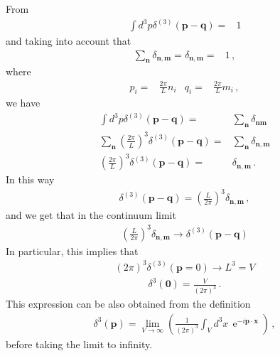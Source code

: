 \begin{frame}
From
\begin{align}
  \int d^3p \delta^{(3)}(\mathbf{p}-\mathbf{q})=&1
\end{align}
and taking into account that
\begin{align}
  \sum_{\mathbf{n}} \delta_{\mathbf{n}, \mathbf{m}}=\delta_{\mathbf{n}, \mathbf{m}}=&1\,,
\end{align}
where
\begin{align}
  p_i=&\frac{2\pi}{L}n_i & q_i=&\frac{2\pi}{L}m_i\,,
\end{align}
we have
\begin{align}
  \int d^3p \delta^{(3)}(\mathbf{p}-\mathbf{q})=&\sum_{\mathbf{n}} \delta_{\mathbf{n}\mathbf{m}}\nonumber\\
 \sum_{\mathbf{n}} \left(\frac{2\pi}{L}\right)^3\delta^{(3)}(\mathbf{p}-\mathbf{q})=&\sum_{\mathbf{n}} \delta_{\mathbf{n}, \mathbf{m}}\nonumber\\
  \left(\frac{2\pi}{L}\right)^3\delta^{(3)}(\mathbf{p}-\mathbf{q})=& \delta_{\mathbf{n}, \mathbf{m}}\,.
\end{align}
In this way
\begin{align}
  \delta^{(3)}(\mathbf{p}-\mathbf{q})=\left(\frac{L}{2\pi}\right)^3\delta_{\mathbf{n},\mathbf{m}}\,,
\end{align}
and we get that in the continuum limit
\begin{align}
  \label{eq:24}
\left(\frac{L}{2\pi}\right)^3\delta_{\mathbf{n},\mathbf{m}}\to  \delta^{(3)}(\mathbf{p}-\mathbf{q})
\end{align}
In particular, this implies that
\begin{align}
  \label{eq:25}
  (2\pi)^3\delta^{(3)}(\mathbf{p}=0)\to L^3=V
\end{align}
\begin{align}
\label{eq:26f}
  \delta^3(\mathbf{0})=\frac{V}{(2\pi)^3}\,.
\end{align}
This expression can be also obtained from the definition
\begin{align}
  \delta^3(\mathbf{p})=\lim_{V\to\infty}\left(\frac{1}{(2\pi)^3}\int_V d^3x\, \operatorname{e}^{-i\mathbf{p}\cdot\mathbf{x} }\right)\,,
\end{align}
before taking the limit to infinity.




\end{frame}
